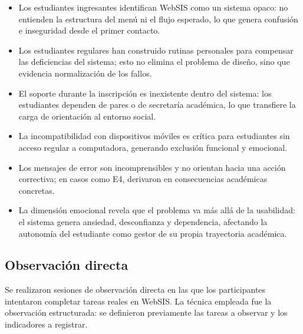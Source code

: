 \begin{itemize}
  \item Los estudiantes ingresantes identifican WebSIS como un sistema opaco: no entienden la estructura del menú ni el flujo esperado, lo que genera confusión e inseguridad desde el primer contacto.
  \item Los estudiantes regulares han construido rutinas personales para compensar las deficiencias del sistema; esto no elimina el problema de diseño, sino que evidencia normalización de los fallos.
  \item El soporte durante la inscripción es inexistente dentro del sistema: los estudiantes dependen de pares o de secretaría académica, lo que transfiere la carga de orientación al entorno social.
  \item La incompatibilidad con dispositivos móviles es crítica para estudiantes sin acceso regular a computadora, generando exclusión funcional y emocional.
  \item Los mensajes de error son incomprensibles y no orientan hacia una acción correctiva; en casos como E4, derivaron en consecuencias académicas concretas.
  \item La dimensión emocional revela que el problema va más allá de la usabilidad: el sistema genera ansiedad, desconfianza y dependencia, afectando la autonomía del estudiante como gestor de su propia trayectoria académica.
\end{itemize}


\subsection{Observación directa}

Se realizaron sesiones de observación directa en las que los participantes intentaron completar tareas reales en WebSIS. La técnica empleada fue la observación estructurada: se definieron previamente las tareas a observar y los indicadores a registrar.

